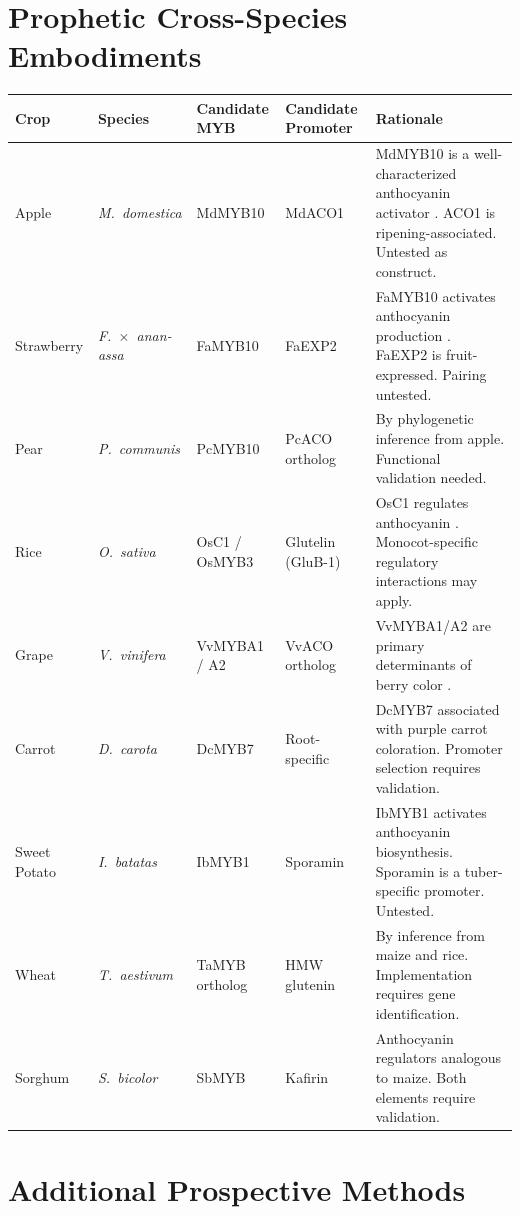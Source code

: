 \documentclass[12pt,a4paper]{article}
\begin{document}
\section{Prophetic Cross-Species Embodiments}

\begin{longtable}{p{2cm} p{2cm} p{2cm} p{2cm} p{5.5cm}}
\toprule
\textbf{Crop} & \textbf{Species} & \textbf{Candidate MYB} & \textbf{Candidate Promoter} & \textbf{Rationale} \\
\midrule
\endhead
Apple & \textit{M.~domestica} & MdMYB10 & MdACO1 & MdMYB10 is a well-characterized anthocyanin activator \citep{Espley2007}. ACO1 is ripening-associated. Untested as construct. \\
\addlinespace
Strawberry & \textit{F.~$\times$~anan-assa} & FaMYB10 & FaEXP2 & FaMYB10 activates anthocyanin production \citep{MedinaPuche2014}. FaEXP2 is fruit-expressed. Pairing untested. \\
\addlinespace
Pear & \textit{P.~communis} & PcMYB10 & PcACO ortholog & By phylogenetic inference from apple. Functional validation needed. \\
\addlinespace
Rice & \textit{O.~sativa} & OsC1 / OsMYB3 & Glutelin (GluB-1) & OsC1 regulates anthocyanin \citep{Saitoh2004}. Monocot-specific regulatory interactions may apply. \\
\addlinespace
Grape & \textit{V.~vinifera} & VvMYBA1 / A2 & VvACO ortholog & VvMYBA1/A2 are primary determinants of berry color \citep{Kobayashi2004}. \\
\addlinespace
Carrot & \textit{D.~carota} & DcMYB7 & Root-specific & DcMYB7 associated with purple carrot coloration. Promoter selection requires validation. \\
\addlinespace
Sweet Potato & \textit{I.~batatas} & IbMYB1 & Sporamin & IbMYB1 activates anthocyanin biosynthesis. Sporamin is a tuber-specific promoter. Untested. \\
\addlinespace
Wheat & \textit{T.~aestivum} & TaMYB ortholog & HMW glutenin & By inference from maize and rice. Implementation requires gene identification. \\
\addlinespace
Sorghum & \textit{S.~bicolor} & SbMYB & Kafirin & Anthocyanin regulators analogous to maize. Both elements require validation. \\
\bottomrule
\end{longtable}

\section{Additional Prospective Methods}
\end{document}
